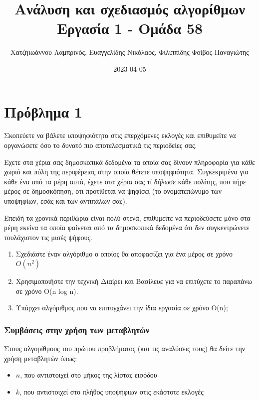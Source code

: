 \documentclass[a4paper,11pt]{article}
\author{Χατζηιωάννου Λαμπρινός, Ευαγγελίδης Νικόλαος, Φιλιππίδης Φοίβος-Παναγιώτης}
\date{2023-04-05}
\title{Ανάλυση και σχεδιασμός αλγορίθμων\\\medskip
\large Εργασία 1 - Ομάδα 58}
\begin{document}
\maketitle
\tableofcontents



\section{Πρόβλημα 1}
\label{sec:org7751545}
Σκοπεύετε να βάλετε υποψηφιότητα στις επερχόμενες εκλογές και επιθυμείτε να
οργανώσετε όσο το δυνατό πιο αποτελεσματικά τις περιοδείες σας.

Εχετε στα χέρια σας δημοσκοπικά δεδομένα τα οποία σας δίνουν πληροφορία για κάθε
χωριό και πόλη της περιφέρειας στην οποία θέτετε υποψηφιότητα. Συγκεκριμένα για
κάθε ένα από τα μέρη αυτά, έχετε στα χέρια σας τί δήλωσε κάθε πολίτης, που πήρε
μέρος σε δημοσκόπηση, οτι προτίθεται να ψηφίσει (το ονοματεπώνυμο των υποψηφίων,
εσάς και των αντιπάλων σας).

Επειδή τα χρονικά περιθώρια είναι πολύ στενά, επιθυμείτε να περιοδεύσετε μόνο
στα μέρη εκείνα τα οποία φαίνεται από τα δημοσκοπικά δεδομένα ότι δεν
συγκεντρώνετε τουλάχιστον τις μισές ψήφους.

\begin{enumerate}
\item Σχεδιάστε έναν αλγόριθμο ο οποίος θα αποφασίζει για ένα μέρος σε χρόνο \(O(n^2)\)
\item Χρησιμοποιήστε την τεχνική Διαίρει και Βασίλευε για να επιτύχετε το παραπάνω
σε χρόνο O(n log n).
\item Υπάρχει αλγόριθμος που να επιτυγχάνει την ίδια εργασία σε χρόνο O(n);
\end{enumerate}

\subsubsection{Συμβάσεις στην χρήση των μεταβλητών}
\label{sec:orgf92a38d}
Στους αλγορίθμους του πρώτου προβλήματος (και τις αναλύσεις τους) θα δείτε την
χρήση μεταβλητών όπως:
\begin{itemize}
\item \(n\), που αντιστοιχεί στο μήκος της λίστας εισόδου
\item \(k\), που αντιστοιχεί στο πλήθος υποψήφιων στις εκάστοτε εκλογές
\end{itemize}
\end{document}
